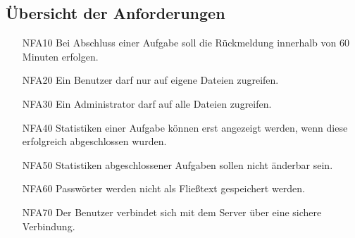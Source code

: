 \documentclass[a4paper,12pt]{article}
\begin{document}
\subsection{Übersicht der Anforderungen}
\begin{itemize}[nosep]
\leftskip=0.5cm

	\item[NFA10] \hspace{\parindent} Bei Abschluss einer Aufgabe soll die Rückmeldung innerhalb von 60 Minuten erfolgen.
	
	\item[NFA20] \hspace{\parindent} Ein \gls{Benutzer} darf nur auf eigene Dateien zugreifen.
	
	\item[NFA30]\hspace{\parindent} Ein \gls{Administrator} darf auf alle Dateien zugreifen.
	
	\item[NFA40] \hspace{\parindent} Statistiken einer Aufgabe können erst angezeigt werden, wenn diese erfolgreich abgeschlossen wurden. %
	
	\item[NFA50] \hspace{\parindent} Statistiken abgeschlossener Aufgaben sollen nicht änderbar sein.
	
	\item[NFA60] \hspace{\parindent} Passwörter werden nicht als Fließtext gespeichert werden.
	
	\item[NFA70] \hspace{\parindent} Der \gls{Benutzer} verbindet sich mit dem Server über eine sichere Verbindung.
	
\end{itemize}
\end{document}
